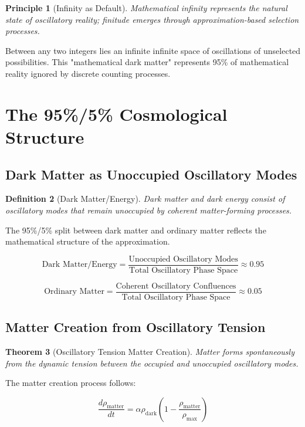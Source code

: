 \documentclass[11pt]{article}
\newtheorem{theorem}{Theorem}[section]
\newtheorem{definition}[theorem]{Definition}
\newtheorem{principle}[theorem]{Principle}
\theoremstyle{remark}
\begin{document}
\begin{principle}[Infinity as Default]
Mathematical infinity represents the natural state of oscillatory reality; finitude emerges through approximation-based selection processes.
\end{principle}

Between any two integers lies an infinite infinite space of oscillations of unselected possibilities. This "mathematical dark matter" represents 95\% of mathematical reality ignored by discrete counting processes.

\section{The 95\%/5\% Cosmological Structure}

\subsection{Dark Matter as Unoccupied Oscillatory Modes}

\begin{definition}[Dark Matter/Energy]
Dark matter and dark energy consist of oscillatory modes that remain unoccupied by coherent matter-forming processes.
\end{definition}

The 95\%/5\% split between dark matter and ordinary matter reflects the mathematical structure of the approximation.

$$\text{Dark Matter/Energy} = \frac{\text{Unoccupied Oscillatory Modes}}{\text{Total Oscillatory Phase Space}} \approx 0.95$$

$$\text{Ordinary Matter} = \frac{\text{Coherent Oscillatory Confluences}}{\text{Total Oscillatory Phase Space}} \approx 0.05$$

\subsection{Matter Creation from Oscillatory Tension}

\begin{theorem}[Oscillatory Tension Matter Creation]
Matter forms spontaneously from the dynamic tension between the occupied and unoccupied oscillatory modes.
\end{theorem}

The matter creation process follows:

$$\frac{d\rho_{\text{matter}}}{dt} = \alpha \rho_{\text{dark}} \left(1 - \frac{\rho_{\text{matter}}}{\rho_{\text{max}}}\right)$$
\end{document}
